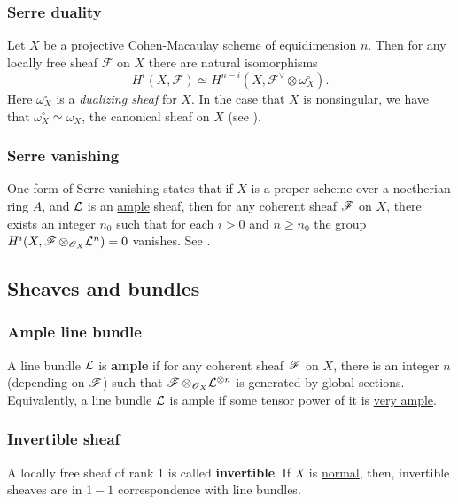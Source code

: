 \documentclass[11pt, english]{article}
\begin{document}
\subsubsection{Serre duality}
\label{serreduality}

Let $X$ be a projective Cohen-Macaulay scheme of equidimension $n$. Then for any locally free sheaf $\mathcal F$ on $X$ there are natural isomorphisms
\[
H^i(X,\mathcal F) \simeq H^{n-i}(X, \mathcal F^\vee \otimes \omega_X^\circ).
\]
Here $\omega_X^\circ$ is a \emph{dualizing sheaf} for $X$. In the case that $X$ is nonsingular, we have that $\omega_X^\circ \simeq \omega_X$, the canonical sheaf on $X$ (see \cite[Chapter III, Corollary 7.12]{hartshorne}). 

\subsubsection{Serre vanishing}
\label{serrevanishing}

One form of Serre vanishing states that if $X$ is a proper scheme over a noetherian ring $A$, and $\mathcal{L}$ is an \hyperref[amplelinebundle]{ample} sheaf, then for any coherent sheaf $\operatorname{\mathscr{F}}$ on $X$, there exists an integer $n_0$ such that for each $i > 0$ and $n \geq n_0$ the group $H^i(X, \operatorname{\mathscr{F}} \otimes_{\operatorname{\mathscr{O}}_X} \mathcal{L}^n)=0$ vanishes. See \cite[Proposition III.5.3]{hartshorne}.

\subsection{Sheaves and bundles}
\subsubsection{Ample line bundle}
\label{amplelinebundle}
A line bundle $\mathcal{L}$ is \textbf{ample} if for any coherent sheaf $\operatorname{\mathscr{F}}$ on $X$, there is an integer $n$ (depending on $\operatorname{\mathscr{F}}$) such that $\operatorname{\mathscr{F}} \otimes_{\operatorname{\mathscr{O}}_X} \mathcal{L}^{\otimes n}$ is generated by global sections. Equivalently, a line bundle $\mathcal{L}$ is ample if some tensor power of it is \hyperref[veryample]{very ample}.

\subsubsection{Invertible sheaf}
\label{invertiblesheaf}
A locally free sheaf of rank 1 is called \textbf{invertible}. If $X$ is \hyperref[normalvariety]{normal}, then, invertible sheaves are in $1-1$ correspondence with line bundles.  
\end{document}
